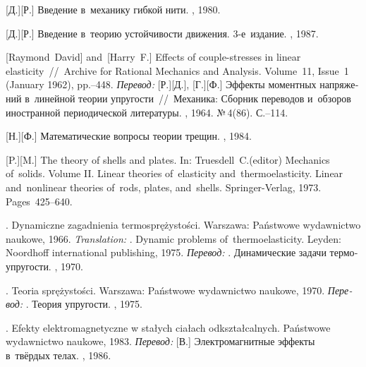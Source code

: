 \begin{thebibliography}{123}
\begin{otherlanguage}{russian}
[Д.][Р.] Введение в~механику гибкой нити. \naukapublisher, 1980. 

[Д.][Р.] Введение в~теорию устойчивости движения. 3\hbox{-}е~издание. \naukapublisher, 1987. 

[Raymond~David] %
and~[Harry~F.] %
Effects of couple-stresses in linear elasticity~//~Archive for Rational Mechanics and Analysis. Volume~11, Issue~1 (January 1962), pp.\hbox{--}448.
\emph{Перевод:}
[Р.][Д.], [Г.][Ф.]
Эффекты моментных напряжений в~линейной теории упругости~//~Механика: Сборник переводов и~обзоров иностранной периодической литературы. \mirpublisher, 1964. №\,4\:(86). С.\hbox{--}114.

[Н.][Ф.] Математические вопросы теории трещин. \naukapublisher, 1984. 

[P.][M.] The theory of shells and plates. In: Truesdell~C.\:(editor) Mechanics of~solids. Volume II. Linear theories of~elasticity and~thermoelasticity. Linear and~nonlinear theories of~rods, plates, and~shells. Springer\hbox{-}Verlag, 1973. Pages~425\hbox{--}640.

.
Dynamiczne zagadnienia termosprężystości.
Warsza\-wa: Państwowe wydawnictwo naukowe, 1966. 
\emph{Translation:}
.
Dynamic problems of~thermoelasticity.
Leyden: Noordhoff international publishing, 1975.
\emph{Перевод:}
.
Динамические задачи термоупругости.
\mirpublisher, 1970.

.
Teoria sprężystości.
Warszawa: Państwowe wy\-daw\-nic\-two naukowe, 1970. 
\emph{Перевод:}
.
Теория упругости.
\mirpublisher, 1975.

. Efekty elektromagnetyczne w stałych ciałach od\-kształ\-cal\-nych. Państwowe wydawnictwo naukowe, 1983. 
\emph{Перевод:}
[В.] Электромагнитные эффекты в~твёрдых телах. \mirpublisher, 1986. 


\end{otherlanguage}
\end{thebibliography}
